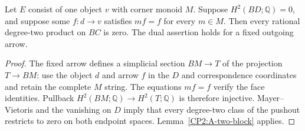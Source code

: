 \begin{corollary}
\label{CP2:A-fixed-arrow}
Let $E$ consist of one object $v$ with corner monoid $M$. Suppose
$H^2(BD;\mathbb Q)=0$, and suppose some $f:d\to v$ satisfies
$mf=f$ for every $m\in M$. Then every rational degree-two product
on $BC$ is zero. The dual assertion holds for a fixed outgoing arrow.
\end{corollary}
\begin{proof}
The fixed arrow defines a simplicial section $BM\to T$ of the
projection $T\to BM$: use the object $d$ and arrow $f$ in the
$D$ and correspondence coordinates and retain the complete $M$
string. The equations $mf=f$ verify the face identities. Pullback
$H^2(BM;\mathbb Q)\to H^2(T;\mathbb Q)$ is therefore injective.
Mayer--Vietoris and the vanishing on $D$ imply that every degree-two
class of the pushout restricts to zero on both endpoint spaces.
Lemma~\ref{CP2:A-two-block} applies.
\end{proof}

